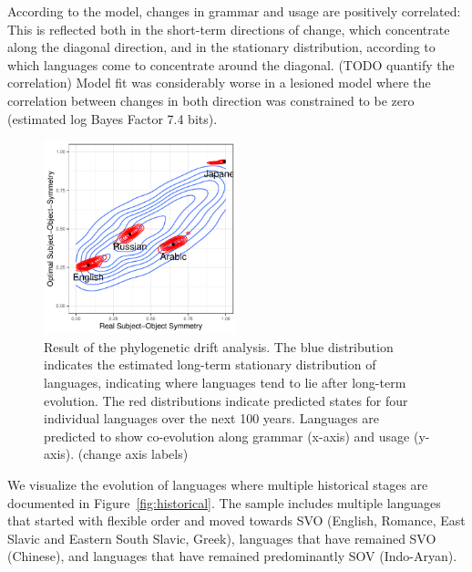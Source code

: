 \documentclass[11pt,a4paper]{article}
\newcommand\mhahn[1]{{\color{red}(#1)}}
\begin{document}
According to the model, changes in grammar and usage are positively correlated:
This is reflected both in the short-term directions of change, which concentrate along the diagonal direction, and in the stationary distribution, according to which languages come to concentrate around the diagonal. \mhahn{TODO quantify the correlation}
Model fit was considerably worse in a lesioned model where the correlation between changes in both direction was constrained to be zero (estimated log Bayes Factor 7.4 bits).


\begin{figure}
    \centering
    \includegraphics[width=0.5\textwidth]{../change/visualize/stationary.pdf}
    \caption{Result of the phylogenetic drift analysis.
    The blue distribution indicates the estimated long-term stationary distribution of languages, indicating where languages tend to lie after long-term evolution.
    The red distributions indicate predicted states for four individual languages over the next 100 years. Languages are predicted to show co-evolution along grammar (x-axis)  and usage (y-axis). \mhahn{change axis labels}}
    \label{fig:drift-model}
\end{figure}



We visualize the evolution of languages where multiple historical stages are documented in Figure~\ref{fig:historical}.
The sample includes multiple languages that started with flexible order and moved towards SVO (English, Romance, East Slavic and Eastern South Slavic, Greek), languages that have remained SVO (Chinese), and languages that have remained predominantly SOV (Indo-Aryan).
\end{document}
